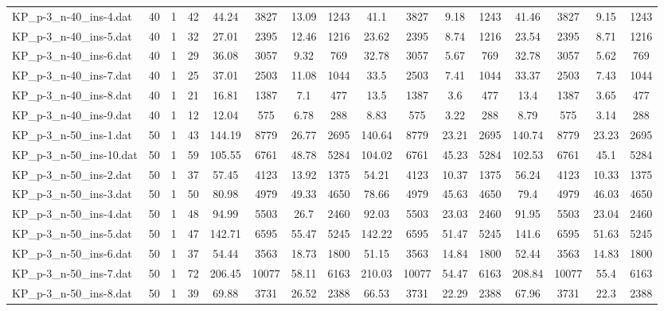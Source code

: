 \begin{sidewaystable}[!ht]
{\begin{tabular}{lccccccccccccccc}
KP\_p-3\_n-40\_ins-4.dat & 40 & 1 & 42 & 44.24 & 3827 & 13.09 & 1243 & 41.1 & 3827 & 9.18 & 1243 & 41.46 & 3827 & 9.15 & 1243 \\
KP\_p-3\_n-40\_ins-5.dat & 40 & 1 & 32 & 27.01 & 2395 & 12.46 & 1216 & 23.62 & 2395 & 8.74 & 1216 & 23.54 & 2395 & 8.71 & 1216 \\
KP\_p-3\_n-40\_ins-6.dat & 40 & 1 & 29 & 36.08 & 3057 & 9.32 & 769 & 32.78 & 3057 & 5.67 & 769 & 32.78 & 3057 & 5.62 & 769 \\
KP\_p-3\_n-40\_ins-7.dat & 40 & 1 & 25 & 37.01 & 2503 & 11.08 & 1044 & 33.5 & 2503 & 7.41 & 1044 & 33.37 & 2503 & 7.43 & 1044 \\
KP\_p-3\_n-40\_ins-8.dat & 40 & 1 & 21 & 16.81 & 1387 & 7.1 & 477 & 13.5 & 1387 &  \textcolor{blue2}{3.6} & 477 & 13.4 & 1387 & 3.65 & 477 \\
KP\_p-3\_n-40\_ins-9.dat & 40 & 1 & 12 & 12.04 & 575 & 6.78 & 288 & 8.83 & 575 & 3.22 & 288 & 8.79 & 575 & 3.14 & 288 \\
KP\_p-3\_n-50\_ins-1.dat & 50 & 1 & 43 & 144.19 & 8779 & 26.77 & 2695 & 140.64 & 8779 &  \textcolor{blue2}{23.21} & 2695 & 140.74 & 8779 & 23.23 & 2695 \\
KP\_p-3\_n-50\_ins-10.dat & 50 & 1 & 59 & 105.55 & 6761 & 48.78 & 5284 & 104.02 & 6761 & 45.23 & 5284 & 102.53 & 6761 & 45.1 & 5284 \\
KP\_p-3\_n-50\_ins-2.dat & 50 & 1 & 37 & 57.45 & 4123 & 13.92 & 1375 & 54.21 & 4123 & 10.37 & 1375 & 56.24 & 4123 & 10.33 & 1375 \\
KP\_p-3\_n-50\_ins-3.dat & 50 & 1 & 50 & 80.98 & 4979 & 49.33 & 4650 & 78.66 & 4979 &  \textcolor{blue2}{45.63} & 4650 & 79.4 & 4979 & 46.03 & 4650 \\
KP\_p-3\_n-50\_ins-4.dat & 50 & 1 & 48 & 94.99 & 5503 & 26.7 & 2460 & 92.03 & 5503 &  \textcolor{blue2}{23.03} & 2460 & 91.95 & 5503 & 23.04 & 2460 \\
KP\_p-3\_n-50\_ins-5.dat & 50 & 1 & 47 & 142.71 & 6595 & 55.47 & 5245 & 142.22 & 6595 & 51.47 & 5245 & 141.6 & 6595 & 51.63 & 5245 \\
KP\_p-3\_n-50\_ins-6.dat & 50 & 1 & 37 & 54.44 & 3563 & 18.73 & 1800 & 51.15 & 3563 & 14.84 & 1800 & 52.44 & 3563 & 14.83 & 1800 \\
KP\_p-3\_n-50\_ins-7.dat & 50 & 1 & 72 & 206.45 & 10077 & 58.11 & 6163 & 210.03 & 10077 &  \textcolor{blue2}{54.47} & 6163 & 208.84 & 10077 & 55.4 & 6163 \\
KP\_p-3\_n-50\_ins-8.dat & 50 & 1 & 39 & 69.88 & 3731 & 26.52 & 2388 & 66.53 & 3731 & 22.29 & 2388 & 67.96 & 3731 & 22.3 & 2388 \\

\end{tabular}}
\end{sidewaystable}
